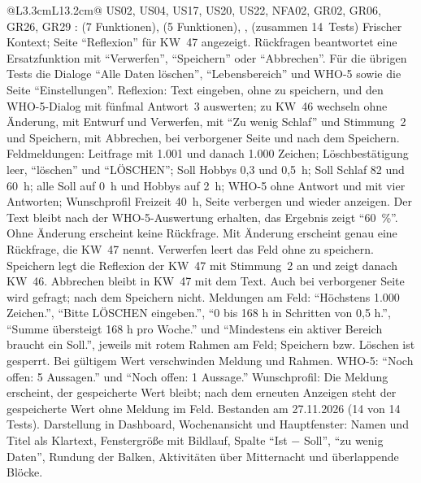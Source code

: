 \begin{longtable}{@{}L{3.3cm}L{13.2cm}@{}}
    {US02, US04, US17, US20, US22, NFA02, GR02, GR06, GR26, GR29}
    {:  (7 Funktionen),  (5 Funktionen), ,  (zusammen 14~Tests)}
    {Frischer Kontext; Seite \enquote{Reflexion} für KW~47 angezeigt. Rückfragen beantwortet eine Ersatzfunktion mit \enquote{Verwerfen}, \enquote{Speichern} oder \enquote{Abbrechen}. Für die übrigen Tests die Dialoge \enquote{Alle Daten löschen}, \enquote{Lebensbereich} und WHO-5 sowie die Seite \enquote{Einstellungen}.}
    {Reflexion: Text eingeben, ohne zu speichern, und den WHO-5-Dialog mit fünfmal Antwort~3 auswerten; zu KW~46 wechseln ohne Änderung, mit Entwurf und Verwerfen, mit \enquote{Zu wenig Schlaf} und Stimmung~2 und Speichern, mit Abbrechen, bei verborgener Seite und nach dem Speichern. Feldmeldungen: Leitfrage mit 1.001 und danach 1.000 Zeichen; Löschbestätigung leer, \enquote{löschen} und \enquote{LÖSCHEN}; Soll Hobbys 0,3 und 0,5~h; Soll Schlaf 82 und 60~h; alle Soll auf 0~h und Hobbys auf 2~h; WHO-5 ohne Antwort und mit vier Antworten; Wunschprofil Freizeit 40~h, Seite verbergen und wieder anzeigen.}
    {Der Text bleibt nach der WHO-5-Auswertung erhalten, das Ergebnis zeigt \enquote{60~\%}. Ohne Änderung erscheint keine Rückfrage. Mit Änderung erscheint genau eine Rückfrage, die KW~47 nennt. Verwerfen leert das Feld ohne zu speichern. Speichern legt die Reflexion der KW~47 mit Stimmung~2 an und zeigt danach KW~46. Abbrechen bleibt in KW~47 mit dem Text. Auch bei verborgener Seite wird gefragt; nach dem Speichern nicht. Meldungen am Feld: \enquote{Höchstens 1.000 Zeichen.}, \enquote{Bitte LÖSCHEN eingeben.}, \enquote{0 bis 168 h in Schritten von 0,5 h.}, \enquote{Summe übersteigt 168 h pro Woche.} und \enquote{Mindestens ein aktiver Bereich braucht ein Soll.}, jeweils mit rotem Rahmen am Feld; Speichern bzw. Löschen ist gesperrt. Bei gültigem Wert verschwinden Meldung und Rahmen. WHO-5: \enquote{Noch offen: 5 Aussagen.} und \enquote{Noch offen: 1 Aussage.} Wunschprofil: Die Meldung erscheint, der gespeicherte Wert bleibt; nach dem erneuten Anzeigen steht der gespeicherte Wert ohne Meldung im Feld.}
    {Bestanden am 27.11.2026 (14 von 14 Tests).}
  \midrule
    {Darstellung in Dashboard, Wochenansicht und Hauptfenster: Namen und Titel als Klartext, Fenstergröße mit Bildlauf, Spalte \enquote{Ist − Soll}, \enquote{zu wenig Daten}, Rundung der Balken, Aktivitäten über Mitternacht und überlappende Blöcke.}

\end{longtable}
